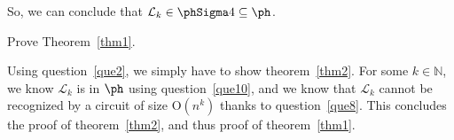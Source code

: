 \documentclass[fontsize=16pt,a4paper,DIV=17,parskip=half]{scrartcl}
\let\mathds\mathbb
\theoremstyle{definition}
\begin{document}
  So, we can conclude that $\mathcal{L}_k \in \phSigma 4 \subseteq \ph$.

  \begin{que}
    Prove Theorem~\ref{thm1}.
  \end{que}

  Using question~\ref{que2}, we simply have to show theorem~\ref{thm2}.
  For some $k \in \mathds{N}$, we know $\mathcal{L}_k$ is in $\ph$ using question~\ref{que10}, and we know that $\mathcal{L}_k$ cannot be recognized by a circuit of size $\mathrm{O}(n^k)$ thanks to question~\ref{que8}.
  This concludes the proof of theorem~\ref{thm2}, and thus proof of theorem~\ref{thm1}.
\end{document}
